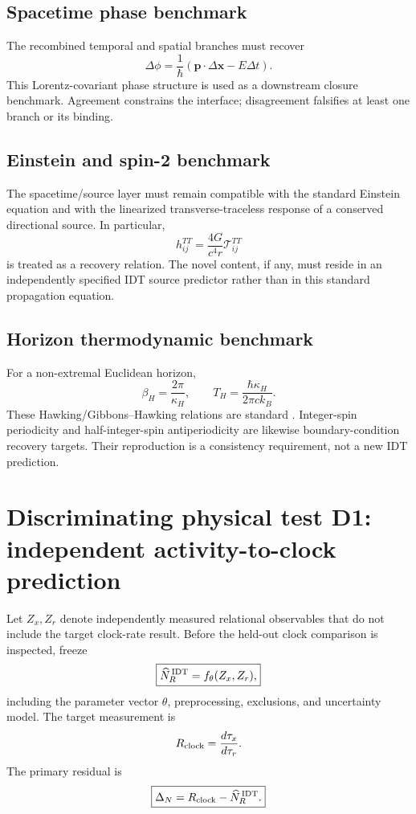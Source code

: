 \subsection{Spacetime phase benchmark}

The recombined temporal and spatial branches must recover
\[
\boxed{
\Delta\phi
=
\frac{1}{\hbar}
\left(\mathbf p\cdot\Delta\mathbf x-E\Delta t\right).
}
\]
This Lorentz-covariant phase structure is used as a downstream closure benchmark. Agreement constrains the interface; disagreement falsifies at least one branch or its binding.

\subsection{Einstein and spin-2 benchmark}

The spacetime/source layer must remain compatible with the standard Einstein equation \cite{Einstein1916} and with the linearized transverse-traceless response of a conserved directional source. In particular,
\[
h_{ij}^{TT}
=
\frac{4G}{c^4r}\mathcal T_{ij}^{TT}
\]
is treated as a recovery relation. The novel content, if any, must reside in an independently specified IDT source predictor rather than in this standard propagation equation.

\subsection{Horizon thermodynamic benchmark}

For a non-extremal Euclidean horizon,
\[
\beta_H=\frac{2\pi}{\kappa_H},
\qquad
\boxed{
T_H=\frac{\hbar\kappa_H}{2\pi c k_B}.
}
\]
These Hawking/Gibbons--Hawking relations are standard \cite{Hawking1975,GibbonsHawking1977}. Integer-spin periodicity and half-integer-spin antiperiodicity are likewise boundary-condition recovery targets. Their reproduction is a consistency requirement, not a new IDT prediction.

\section{Discriminating physical test D1: independent activity-to-clock prediction}

Let \(Z_x,Z_r\) denote independently measured relational observables that do not include the target clock-rate result. Before the held-out clock comparison is inspected, freeze
\[
\boxed{
\widehat N_R^{\,\rm IDT}
=
f_{\theta}(Z_x,Z_r),
}
\]
including the parameter vector \(\theta\), preprocessing, exclusions, and uncertainty model. The target measurement is
\[
R_{\rm clock}
=
\frac{d\tau_x}{d\tau_r}.
\]
The primary residual is
\[
\boxed{
\Delta_N
=
R_{\rm clock}
-
\widehat N_R^{\,\rm IDT}.
}
\]

